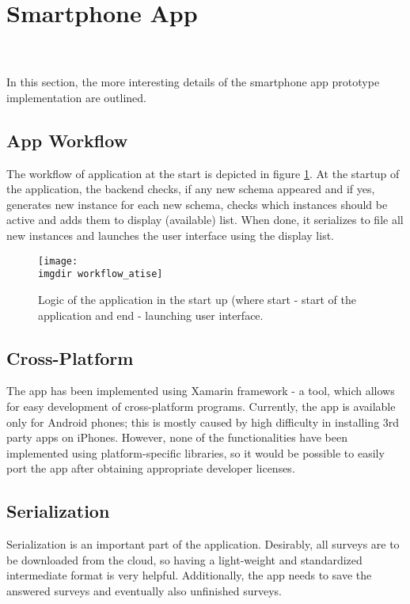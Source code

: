 \section{Smartphone App}
\label{sec:app}
\anna \\\\
In this section, the more interesting details of the smartphone app prototype implementation are outlined.

\subsection{App Workflow}
\label{subsec:workflow}
The workflow of application at the start is depicted in figure \ref{fig:startup-workflow}. At the startup of the application, the backend checks, if any new schema appeared and if yes, generates new instance for each new schema, checks which instances should be active and adds them to display (available) list. When done, it serializes to file all new instances and launches the user interface using the display list. 

\begin{figure}[!htbp]
  \centering
    \centering
    \texttt{[image: \\imgdir workflow\_atise]}
    \caption{Logic of the application in the start up (where start - start of the application and end - launching user interface.}
    \label{fig:startup-workflow}
\end{figure}

\subsection{Cross-Platform}
\label{subsec:crossplatform}
The app has been implemented using Xamarin framework - a tool, which allows for easy development of cross-platform programs. Currently, the app is available only for Android phones; this is mostly caused by high difficulty in installing 3rd party apps on iPhones. However, none of the functionalities have been implemented using platform-specific libraries, so it would be possible to easily port the app after obtaining appropriate developer licenses. 

\subsection{Serialization}
\label{subsec:serialization}
Serialization is an important part of the application. Desirably, all surveys are to be downloaded from the cloud, so having a light-weight and standardized intermediate format is very helpful. Additionally, the app needs to save the answered surveys and eventually also unfinished surveys.

